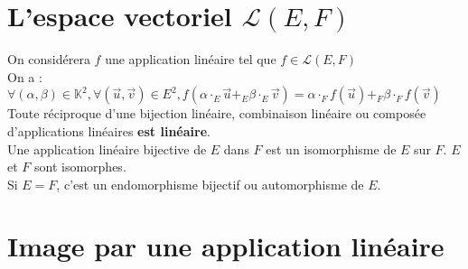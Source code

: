 \section{L'espace vectoriel $\mathcal{L}(E, F)$}\label{sec:l'espace-vectoriel-$mathcal{l}(e-f)$}

On considérera $f$ une application linéaire tel que $f \in \mathcal{L}(E, F)$\\
On a : $\forall (\alpha, \beta) \in \mathbb{K}^2, \forall (\vec u, \vec v) \in E^2, f(\alpha \cdot_E \vec u +_E  \beta \cdot_E \vec v) = \alpha \cdot_F f(\vec u) +_F \beta \cdot_F f(\vec v)$\\

Toute réciproque d'une bijection linéaire, combinaison linéaire ou composée d'applications linéaires \textbf{est linéaire}.\\
Une application linéaire bijective de $E$ dans $F$ est un isomorphisme de $E$ sur $F$.
$E$ et $F$ sont isomorphes.\\
Si $E = F$, c'est un endomorphisme bijectif ou automorphisme de $E$.


\section{Image par une application linéaire}\label{sec:image-par-une-application-lineaire}


